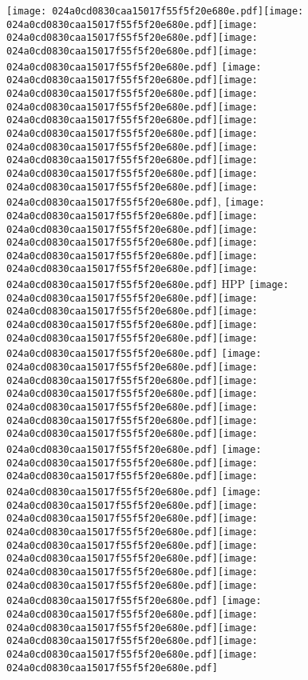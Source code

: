 \documentclass{article}
\newcommand{\origpg}[2]{\texttt{[image: 024a0cd0830caa15017f55f5f20e680e.pdf]}}
\begin{document}
{\vspace{0.385pt}\origpg4{85.303pt 130.14pt 92.469pt 146.28pt}\origpg4{92.517pt 130.14pt 100.14pt 146.28pt}\origpg4{100.22pt 130.14pt 108.29pt 146.28pt}\origpg4{108.38pt 130.14pt 115.55pt 146.28pt}\hspace{-0.178pt}\origpg4{115.37pt 130.14pt 124.01pt 146.28pt} \origpg4{130.77pt 130.14pt 138.84pt 146.28pt}\origpg4{138.94pt 130.14pt 146.1pt 146.28pt}\hspace{-0.178pt}\origpg4{145.93pt 130.14pt 153.09pt 146.28pt}\hspace{0.291pt}\origpg4{153.38pt 130.14pt 161.44pt 146.28pt}\origpg4{161.34pt 130.14pt 169.97pt 146.28pt}\origpg4{169.97pt 130.14pt 176.35pt 146.28pt}\origpg4{176.27pt 130.14pt 183.44pt 146.28pt}\origpg4{183.48pt 130.14pt 192.12pt 146.28pt}\origpg4{192.12pt 130.14pt 200.75pt 146.28pt}\hspace{-0.161pt}\origpg4{70.5mm 130.14pt 209.23pt 146.28pt}, \origpg4{220.52pt 130.14pt 230.74pt 146.28pt}\origpg4{230.64pt 130.14pt 238.71pt 146.28pt}\hspace{-0.597pt}\origpg4{238.12pt 130.14pt 246.33pt 146.28pt}\origpg4{246.33pt 130.14pt 253.5pt 146.28pt}\hspace{-0.21pt}\origpg4{253.29pt 130.14pt 261.34pt 146.28pt}\origpg4{261.25pt 130.14pt 268.61pt 146.28pt} HPP \origpg4{311.85pt 130.14pt 319.01pt 146.28pt}\origpg4{319.06pt 130.14pt 326.11pt 146.28pt}\origpg4{326.05pt 130.14pt 333.21pt 146.28pt}\hspace{0.291pt}\origpg4{333.51pt 130.14pt 341.56pt 146.28pt}\origpg4{341.46pt 130.14pt 348.63pt 146.28pt} \origpg4{355.65pt 130.14pt 363.72pt 146.28pt}\origpg4{363.82pt 130.14pt 370.98pt 146.28pt}\origpg4{371.03pt 130.14pt 379.67pt 146.28pt}\origpg4{379.67pt 130.14pt 387.74pt 146.28pt}\hspace{-0.323pt}\origpg4{387.41pt 130.14pt 395.03pt 146.28pt}\origpg4{395.11pt 130.14pt 403.18pt 146.28pt}\hspace{-0.113pt}\origpg4{403.07pt 130.14pt 411.71pt 146.28pt} \origpg4{418.71pt 130.14pt 426.93pt 146.28pt}\origpg4{426.93pt 130.14pt 434.98pt 146.28pt}\hspace{-0.129pt}\origpg4{434.85pt 130.14pt 442.27pt 146.28pt} \origpg4{448.81pt 130.14pt 456.88pt 146.28pt}\origpg4{456.98pt 130.14pt 464.14pt 146.28pt}\origpg4{464.19pt 130.14pt 470.57pt 146.28pt}\hspace{-0.113pt}\origpg4{470.46pt 130.14pt 478.07pt 146.28pt}\origpg4{478.15pt 130.14pt 486.79pt 146.28pt}\origpg4{486.79pt 130.14pt 493.84pt 146.28pt}\hspace{-0.274pt}\origpg4{493.57pt 130.14pt 502.2pt 146.28pt}\origpg4{502.2pt 130.14pt 509.63pt 146.28pt} \origpg4{516.42pt 130.14pt 524.64pt 146.28pt}\origpg4{524.64pt 130.14pt 532.71pt 146.28pt}\hspace{-0.387pt}\origpg4{532.32pt 130.14pt 540.38pt 146.28pt}\origpg4{540.28pt 130.14pt 547.45pt 146.28pt}\origpg4{547.49pt 130.14pt 554.66pt 146.28pt} 

}
\end{document}
